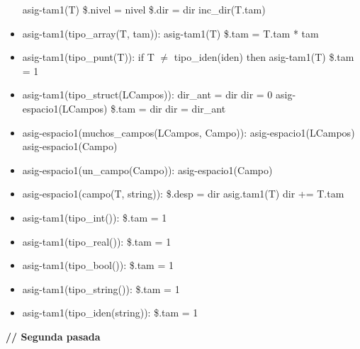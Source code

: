 \documentclass[11pt]{article}
\begin{document}
\begin{itemize}
                \subitem asig-tam1(T)
                \subitem \$.nivel = nivel
                \subitem \$.dir = dir
                \subitem inc\_dir(T.tam)
            \item asig-tam1(tipo\_array(T, tam)): 
                \subitem asig-tam1(T)
                \subitem \$.tam = T.tam * tam
            \item asig-tam1(tipo\_punt(T)): 
                \subitem if T $\neq$ tipo\_iden(iden) then
                    \subsubitem asig-tam1(T)
                \subitem \$.tam = 1
            \item asig-tam1(tipo\_struct(LCampos)): 
                \subitem dir\_ant = dir
                \subitem dir = 0
                \subitem asig-espacio1(LCampos)
                \subitem \$.tam = dir
                \subitem dir = dir\_ant
            \item asig-espacio1(muchos\_campos(LCampos, Campo)): 
                \subitem asig-espacio1(LCampos)
                \subitem asig-espacio1(Campo)
            \item asig-espacio1(un\_campo(Campo)): 
                \subitem asig-espacio1(Campo)
            \item asig-espacio1(campo(T, string)): 
                \subitem \$.desp = dir
                \subitem asig.tam1(T)
                \subitem dir += T.tam
            \item asig-tam1(tipo\_int()): 
                \subitem \$.tam = 1
            \item asig-tam1(tipo\_real()): 
                \subitem \$.tam = 1
            \item asig-tam1(tipo\_bool()): 
                \subitem \$.tam = 1
            \item asig-tam1(tipo\_string()): 
                \subitem \$.tam = 1
            \item asig-tam1(tipo\_iden(string)): 
                \subitem \$.tam = 1
        \end{itemize}
        \textbf{\/// Segunda pasada}
\end{document}
